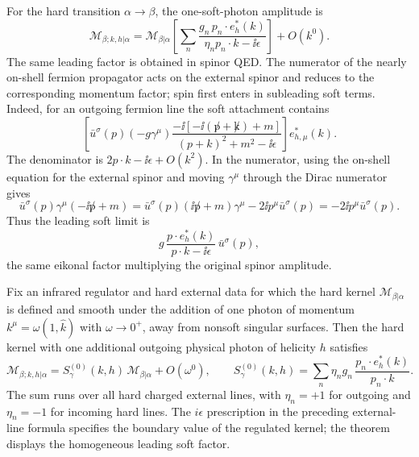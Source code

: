For the hard transition \(\alpha\to\beta\), the one-soft-photon amplitude is
\[
  \mathcal M_{\beta;k,h|\alpha}
  =
  \mathcal M_{\beta|\alpha}
  \left[
    \sum_n
    \frac{g_n\,p_n\cdot e_h^*(k)}
         {\eta_n p_n\cdot k-\ii\epsilon}
  \right]
  +O(k^0).
\]
The same leading factor is obtained in spinor QED.  The numerator of the
nearly on-shell fermion propagator acts on the external spinor and reduces to
the corresponding momentum factor; spin first enters in subleading soft
terms.
Indeed, for an outgoing fermion line the soft attachment contains
\[
  \left[
  \bar u^\sigma(p)(-g\gamma^\mu)
  \frac{-\ii[-\ii(\not p+\not k)+m]}
       {(p+k)^2+m^2-\ii\epsilon}
  \right]e^*_{h,\mu}(k).
\]
The denominator is \(2p\cdot k-\ii\epsilon+O(k^2)\).  In the numerator,
using the on-shell equation for the external spinor and moving
\(\gamma^\mu\) through the Dirac numerator gives
\[
  \bar u^\sigma(p)\gamma^\mu(-\ii\not p+m)
  =
  \bar u^\sigma(p)(\ii\not p+m)\gamma^\mu
  -2\ii p^\mu\bar u^\sigma(p)
  =
  -2\ii p^\mu\bar u^\sigma(p).
\]
Thus the leading soft limit is
\[
  g\,\frac{p\cdot e_h^*(k)}{p\cdot k-\ii\epsilon}\,
  \bar u^\sigma(p),
\]
the same eikonal factor multiplying the original spinor amplitude.

\begin{theorem}
\label{thm:weinberg-leading-soft-photon}
Fix an infrared regulator and hard external data for which the hard kernel
\(\mathcal M_{\beta|\alpha}\) is defined and smooth under the addition of one
photon of momentum \(k^\mu=\omega(1,\widehat k)\) with \(\omega\to0^+\), away
from nonsoft singular surfaces.  Then the hard kernel with one additional
outgoing physical photon of helicity \(h\) satisfies
\begin{equation}
  \mathcal M_{\beta;k,h|\alpha}
  =
  S_\gamma^{(0)}(k,h)\,
  \mathcal M_{\beta|\alpha}
  +O(\omega^0),
  \qquad
  S_\gamma^{(0)}(k,h)
  =
  \sum_n
  \eta_n g_n\,
  \frac{p_n\cdot e_h^*(k)}{p_n\cdot k}.
  \label{eq:weinberg-leading-soft-photon}
\end{equation}
The sum runs over all hard charged external lines, with \(\eta_n=+1\) for
outgoing and \(\eta_n=-1\) for incoming hard lines.  The \(i\epsilon\)
prescription in the preceding external-line formula specifies the boundary
value of the regulated kernel; the theorem displays the homogeneous leading
soft factor.
\end{theorem}

